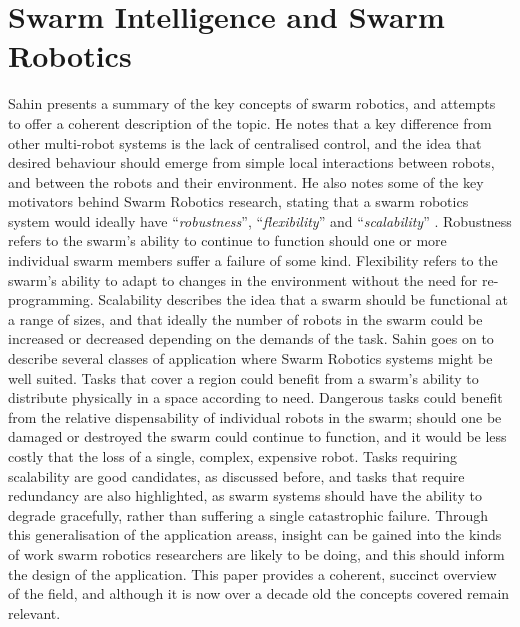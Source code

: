 \section{Swarm Intelligence and Swarm Robotics} \label{GeneralSwarmRobotics}
Sahin \cite{Sahin:2004} presents a summary of the key concepts of swarm robotics, and attempts to offer a coherent description of the topic. He notes that a key difference from other multi-robot systems is the lack of centralised control, and the idea that desired behaviour should emerge from simple local interactions between robots, and between the robots and their environment. He also notes some of the key motivators behind Swarm Robotics research, stating that a swarm robotics system would ideally have ``\textit{robustness}'', ``\textit{flexibility}'' and ``\textit{scalability}'' \cite{Sahin:2004}. Robustness refers to the swarm's ability to continue to function should one or more individual swarm members suffer a failure of some kind. Flexibility refers to the swarm's ability to adapt to changes in the environment without the need for re-programming. Scalability describes the idea that a swarm should be functional at a range of sizes, and that ideally the number of robots in the swarm could be increased or decreased depending on the demands of the task. Sahin \cite{Sahin:2004} goes on to describe several classes of application where Swarm Robotics systems might be well suited. Tasks that cover a region could benefit from a swarm's ability to distribute physically in a space according to need. Dangerous tasks could benefit from the relative dispensability of individual robots in the swarm; should one be damaged or destroyed the swarm could continue to function, and it would be less costly that the loss of a single, complex, expensive robot. Tasks requiring scalability are good candidates, as discussed before, and tasks that require redundancy are also highlighted, as swarm systems should have the ability to degrade gracefully, rather than suffering a single catastrophic failure. Through this generalisation of the application areass, insight can be gained into the kinds of work swarm robotics researchers are likely to be doing, and this should inform the design of the application. This paper \cite{Sahin:2004} provides a coherent, succinct overview of the field, and although it is now over a decade old the concepts covered remain relevant.


